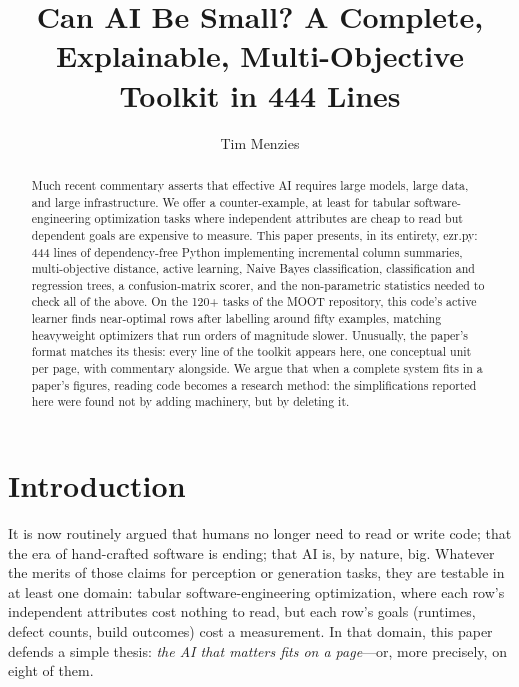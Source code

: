 \documentclass[acmsmall,nonacm]{acmart}
\title[ezr.py]{Can AI Be Small? A Complete, Explainable,
Multi-Objective Toolkit in 444 Lines}
\author{Tim Menzies}
\affiliation{\institution{North Carolina State University}
  \city{Raleigh}\country{USA}}
\begin{document}
\begin{abstract}
Much recent commentary asserts that effective AI requires
large models, large data, and large infrastructure. We offer
a counter-example, at least for tabular software-engineering
optimization tasks where independent attributes are cheap to
read but dependent goals are expensive to measure. This
paper presents, in its entirety, ezr.py: 444 lines of
dependency-free Python implementing incremental column
summaries, multi-objective distance, active learning,
Naive Bayes classification, classification and regression
trees, a confusion-matrix scorer, and the non-parametric
statistics needed to check all of the above. On the 120+
tasks of the MOOT repository, this code's active learner
finds near-optimal rows after labelling around fifty
examples, matching heavyweight optimizers that run orders
of magnitude slower. Unusually, the paper's format matches
its thesis: every line of the toolkit appears here, one
conceptual unit per page, with commentary alongside. We
argue that when a complete system fits in a paper's
figures, reading code becomes a research method: the
simplifications reported here were found not by adding
machinery, but by deleting it.
\end{abstract}
\maketitle

\section{Introduction}
It is now routinely argued that humans no longer need to
read or write code; that the era of hand-crafted software is
ending; that AI is, by nature, big. Whatever the merits of
those claims for perception or generation tasks, they are
testable in at least one domain: tabular software-engineering
optimization, where each row's independent attributes cost
nothing to read, but each row's goals (runtimes, defect
counts, build outcomes) cost a measurement. In that domain,
this paper defends a simple thesis: \emph{the AI that
matters fits on a page}---or, more precisely, on eight of
them.
\end{document}
